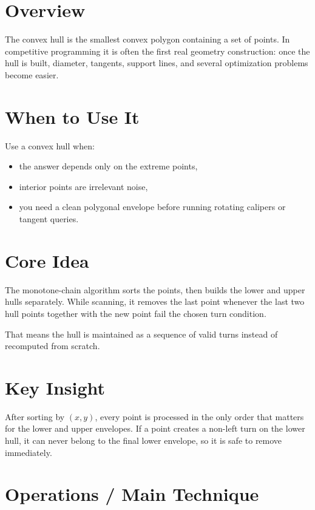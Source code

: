 \section*{Overview}

The convex hull is the smallest convex polygon containing a set of points. In competitive programming it is often the
first real geometry construction: once the hull is built, diameter, tangents, support lines, and several optimization
problems become easier.

\section*{When to Use It}

Use a convex hull when:

\begin{itemize}
  \item the answer depends only on the extreme points,
  \item interior points are irrelevant noise,
  \item you need a clean polygonal envelope before running rotating calipers or tangent queries.
\end{itemize}

\section*{Core Idea}

The monotone-chain algorithm sorts the points, then builds the lower and upper hulls separately. While scanning, it
removes the last point whenever the last two hull points together with the new point fail the chosen turn condition.

That means the hull is maintained as a sequence of valid turns instead of recomputed from scratch.

\section*{Key Insight}

After sorting by \((x, y)\), every point is processed in the only order that matters for the lower and upper envelopes.
If a point creates a non-left turn on the lower hull, it can never belong to the final lower envelope, so it is safe
to remove immediately.

\section*{Operations / Main Technique}

